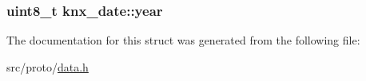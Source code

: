 \subsubsection[{\texorpdfstring{year}{year}}]{\setlength{\rightskip}{0pt plus 5cm}uint8\+\_\+t knx\+\_\+date\+::year}\hypertarget{structknx__date_a12fbc4580c575f2fde6a6cfb1342d3bd}{}\label{structknx__date_a12fbc4580c575f2fde6a6cfb1342d3bd}


The documentation for this struct was generated from the following file\+:\begin{DoxyCompactItemize}
\item 
src/proto/\hyperlink{data_8h}{data.\+h}\end{DoxyCompactItemize}
